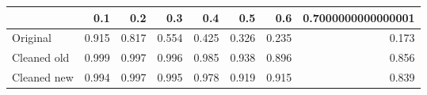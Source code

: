 \begin{tabular}{lrrrrrrr}
\toprule
{} &   0.1 &   0.2 &   0.3 &   0.4 &   0.5 &   0.6 & 0.7000000000000001 \\
\midrule
Original    & 0.915 & 0.817 & 0.554 & 0.425 & 0.326 & 0.235 &              0.173 \\
Cleaned old & 0.999 & 0.997 & 0.996 & 0.985 & 0.938 & 0.896 &              0.856 \\
Cleaned new & 0.994 & 0.997 & 0.995 & 0.978 & 0.919 & 0.915 &              0.839 \\
\bottomrule
\end{tabular}
